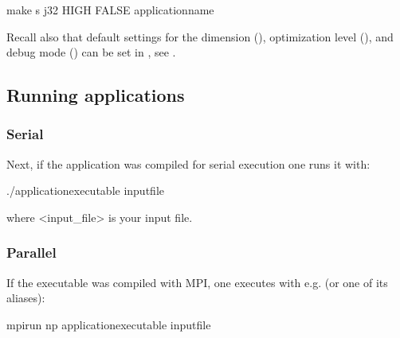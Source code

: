 \documentclass[letterpaper,10pt,english]{sphinxmanual}
\begin{document}
\begin{sphinxVerbatim}[commandchars=\\\{\},formatcom=\scriptsize]
make \PYGZhy{}s \PYGZhy{}j32  HIGH FALSE \PYGZlt{}application\PYGZus{}name\PYGZgt{}
\end{sphinxVerbatim}

Recall also that default settings for the dimension (), optimization level (), and debug mode () can be set in , see .


\subsection{Running applications}
\label{\detokenize{Base/Control:running-applications}}

\subsubsection{Serial}
\label{\detokenize{Base/Control:serial}}
Next, if the application was compiled for serial execution one runs it with:

\begin{sphinxVerbatim}[commandchars=\\\{\},formatcom=\scriptsize]
./\PYGZlt{}application\PYGZus{}executable\PYGZgt{} \PYGZlt{}input\PYGZus{}file\PYGZgt{}
\end{sphinxVerbatim}

where \textless{}input\_file\textgreater{} is your input file.


\subsubsection{Parallel}
\label{\detokenize{Base/Control:parallel}}
If the executable was compiled with MPI, one executes with e.g.  (or one of its aliases):

\begin{sphinxVerbatim}[commandchars=\\\{\},formatcom=\scriptsize]
mpirun \PYGZhy{}np  \PYGZlt{}application\PYGZus{}executable\PYGZgt{} \PYGZlt{}input\PYGZus{}file\PYGZgt{}
\end{sphinxVerbatim}
\end{document}
